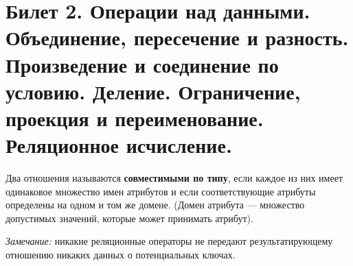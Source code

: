 \newpage
\section{Билет 2. Операции над данными. Объединение, пересечение и разность. Произведение и соединение по условию. Деление. Ограничение, проекция и переименование. Реляционное исчисление.}

Два отношения называются  \textbf{совместимыми по типу}, если каждое из них имеет одинаковое множество имен атрибутов и если соответствующие атрибуты определены на одном и том же домене. 
(Домен атрибута — множество допустимых значений, которые может принимать атрибут). 

\textit{Замечание:} никакие реляционные операторы не передают результатирующему отношению никаких данных о потенциальных ключах.

